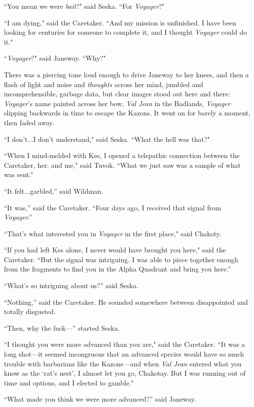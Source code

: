 \documentclass[twoside,letterpaper,12pt]{memoir}
\begin{document}
``You mean we were \textit{bait}?" said Seska. ``For \textit{Voyager}?" 

``I am dying," said the Caretaker. ``And my mission is unfinished. I have been looking for centuries for someone to complete it, and I thought \textit{Voyager} could do it." 

``\textit{Voyager}?" said Janeway. ``Why?" 

There was a piercing tone loud enough to drive Janeway to her knees, and then a flash of light and noise and \textit{thoughts} across her mind, jumbled and incomprehensible, garbage data, but clear images stood out here and there: \textit{Voyager}'s name painted across her bow, \textit{Val Jean} in the Badlands, \textit{Voyager} slipping backwards in time to escape the Kazons. It went on for barely a moment, then faded away. 

``I don't...I don't understand," said Seska. ``What the hell was that?" 

``When I mind-melded with Kes, I opened a telepathic connection between the Caretaker, her, and me," said Tuvok. ``What we just saw was a sample of what was sent.” 

``It felt...garbled,” said Wildman. 

``It was,” said the Caretaker. ``Four days ago, I received that signal from \textit{Voyager}.” 

``That's what interested you in \textit{Voyager} in the first place," said Chakoty. 

``If you had left Kes alone, I never would have brought you here," said the Caretaker. ``But the signal was intriguing. I was able to piece together enough from the fragments to find you in the Alpha Quadrant and bring you here.” 

``What’s so intriguing about us?” said Seska. 

``Nothing,” said the Caretaker. He sounded somewhere between disappointed and totally disgusted. 

``Then, why the fuck---” started Seska. 

``I thought you were more advanced than you are," said the Caretaker. ``It was a long shot---it seemed incongruous that an advanced species would have so much trouble with barbarians like the Kazons---and when \textit{Val Jean} entered what you know as the `rat's nest', I almost let you go, Chakotay. But I was running out of time and options, and I elected to gamble." 

``What made you think we were more advanced?” said Janeway. 
\end{document}
